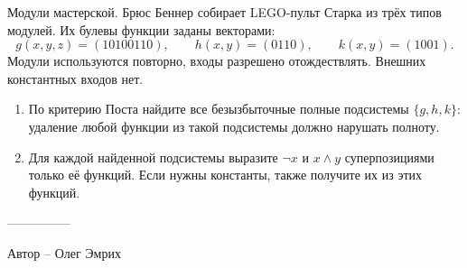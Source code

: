 \question
Модули мастерской. Брюс Беннер собирает LEGO-пульт Старка из трёх типов модулей. Их булевы функции заданы векторами:
\[
g(x,y,z)=(10100110),\qquad h(x,y)=(0110),\qquad k(x,y)=(1001).
\]
Модули используются повторно, входы разрешено отождествлять. Внешних константных входов нет.
\begin{enumerate}
\item По критерию Поста найдите все безызбыточные полные подсистемы $\{g,h,k\}$: удаление любой функции из такой подсистемы должно нарушать полноту.
\item Для каждой найденной подсистемы выразите $\neg x$ и $x\land y$ суперпозициями только её функций. Если нужны константы, также получите их из этих функций.
\end{enumerate}

---------------

Автор -- Олег Эмрих
